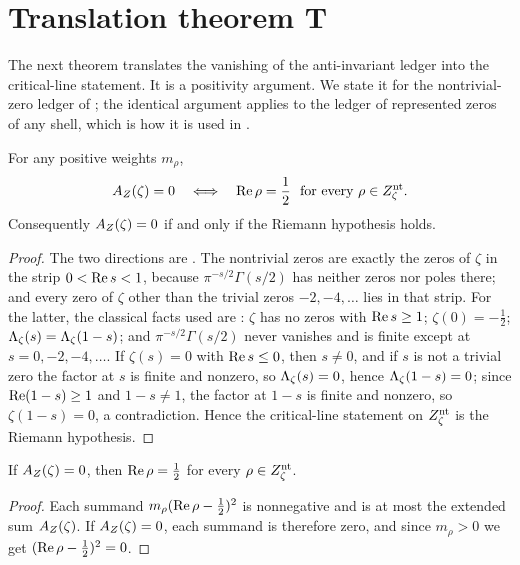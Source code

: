 \section{Translation theorem T}
\label{sec:translation_theorem}

The next theorem translates the vanishing of the anti-invariant ledger
into the critical-line statement.  It is a positivity argument.  We
state it for the nontrivial-zero ledger of
; the identical argument applies to
the ledger of represented zeros of any shell, which is how it is used
in .

\begin{theorem}
\label{thm:rh:translation-T}
For any positive weights \(m_\rho\),
\[
  A_{Z}(\zeta)=0
  \quad\Longleftrightarrow\quad
  \operatorname{Re}\rho=\frac12\ \text{ for every }\rho\in Z_{\zeta}^{\mathrm{nt}} .
\]
Consequently \(A_{Z}(\zeta)=0\) if and only if the Riemann hypothesis holds.
\end{theorem}

\begin{proof}
The two directions are
.  The
nontrivial zeros are exactly the zeros of \(\zeta\) in the strip
\(0<\operatorname{Re} s<1\), because \(\pi^{-s/2}\Gamma(s/2)\) has neither zeros
nor poles there; and every zero of \(\zeta\) other than the trivial zeros \(-2,-4,\ldots\)
lies in that strip.  For the latter, the classical facts used are
\citep{TitchmarshHeathBrown1986}: \(\zeta\) has no zeros with
\(\operatorname{Re} s\geq1\); \(\zeta(0)=-\frac12\); \(\Lambda_{\zeta}(s)=\Lambda_{\zeta}(1-s)\); and
\(\pi^{-s/2}\Gamma(s/2)\) never vanishes and is finite except at
\(s=0,-2,-4,\ldots\).  If \(\zeta(s)=0\) with \(\operatorname{Re} s\leq0\), then
\(s\neq0\), and if \(s\) is not a trivial zero the factor at \(s\) is
finite and nonzero, so \(\Lambda_{\zeta}(s)=0\), hence \(\Lambda_{\zeta}(1-s)=0\); since
\(\operatorname{Re}(1-s)\geq1\) and \(1-s\neq1\), the factor at \(1-s\) is finite and
nonzero, so \(\zeta(1-s)=0\), a contradiction.  Hence the critical-line
statement on \(Z_{\zeta}^{\mathrm{nt}}\) is the Riemann hypothesis.
\end{proof}

\begin{theorem}
\label{thm:rh:translation-T-forward}
If \(A_{Z}(\zeta)=0\), then \(\operatorname{Re}\rho=\frac12\) for every \(\rho\in Z_{\zeta}^{\mathrm{nt}}\).
\end{theorem}

\begin{proof}
Each summand \(m_\rho(\operatorname{Re}\rho-\frac12)^2\) is nonnegative and is at
most the extended sum \(A_{Z}(\zeta)\).  If \(A_{Z}(\zeta)=0\), each summand is therefore
zero, and since \(m_\rho>0\) we get \((\operatorname{Re}\rho-\frac12)^2=0\).
\end{proof}


